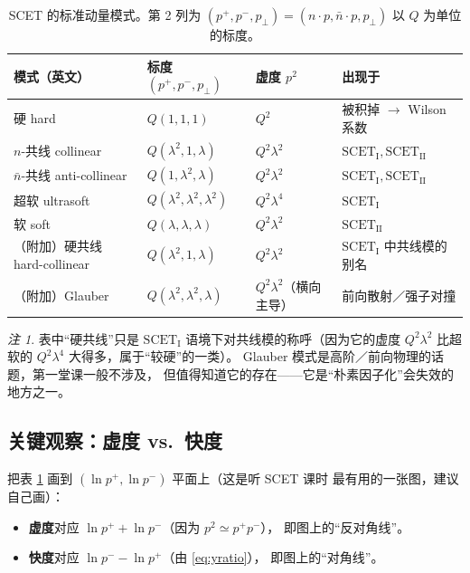 \documentclass[UTF8,a4paper,11pt]{ctexart}
\theoremstyle{definition}
\theoremstyle{remark}
\newtheorem{remark}{注}[section]
\theoremstyle{plain}
\newcommand{\SCETI}{\text{SCET}_{\mathrm{I}}}
\newcommand{\SCETII}{\text{SCET}_{\mathrm{II}}}
\newcommand{\en}[1]{\textsf{#1}}   %
\begin{document}
\begin{table}[htbp]
\centering
\caption{SCET 的标准动量模式。第 2 列为 $(p^+,p^-,p_\perp)=(n\cdot p,\bar n\cdot p,p_\perp)$
以 $Q$ 为单位的标度。}
\label{tab:modes}
\begin{tabular}{@{}llll@{}}
\toprule
模式（英文） & 标度 $(p^+,p^-,p_\perp)$ & 虚度 $p^2$ & 出现于 \\
\midrule
硬 \en{hard}                       & $Q(1,1,1)$                     & $Q^2$            & 被积掉 $\to$ Wilson 系数 \\
$n$-共线 \en{collinear}            & $Q(\lambda^2,1,\lambda)$       & $Q^2\lambda^2$   & $\SCETI,\SCETII$ \\
$\bar n$-共线 \en{anti-collinear}  & $Q(1,\lambda^2,\lambda)$       & $Q^2\lambda^2$   & $\SCETI,\SCETII$ \\
超软 \en{ultrasoft}                & $Q(\lambda^2,\lambda^2,\lambda^2)$ & $Q^2\lambda^4$ & $\SCETI$ \\
软 \en{soft}                       & $Q(\lambda,\lambda,\lambda)$   & $Q^2\lambda^2$   & $\SCETII$ \\
\midrule
（附加）硬共线 \en{hard-collinear} & $Q(\lambda^2,1,\lambda)$       & $Q^2\lambda^2$   & $\SCETI$ 中共线模的别名 \\
（附加）Glauber                    & $Q(\lambda^2,\lambda^2,\lambda)$ & $Q^2\lambda^2$（横向主导） & 前向散射／强子对撞 \\
\bottomrule
\end{tabular}
\end{table}

\begin{remark}
表中“硬共线”只是 $\SCETI$ 语境下对共线模的称呼（因为它的虚度
$Q^2\lambda^2$ 比超软的 $Q^2\lambda^4$ 大得多，属于“较硬”的一类）。
Glauber 模式是高阶／前向物理的话题，第一堂课一般不涉及，
但值得知道它的存在——它是“朴素因子化”会失效的地方之一。
\end{remark}

\subsection{关键观察：虚度 vs.\ 快度}
\label{subsec:virtvsrap}

把表 \ref{tab:modes} 画到 $(\ln p^+,\ln p^-)$ 平面上（这是听 SCET 课时
最有用的一张图，建议自己画）：

\begin{itemize}
  \item \textbf{虚度}对应 $\ln p^++\ln p^-$（因为 $p^2\simeq p^+p^-$），
        即图上的“反对角线”。
  \item \textbf{快度}对应 $\ln p^--\ln p^+$（由 \eqref{eq:yratio}），
        即图上的“对角线”。
\end{itemize}
\end{document}
